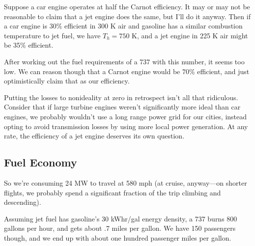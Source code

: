 \documentclass[12pt]{article}
\begin{document}
Suppose a car engine operates at half the Carnot efficiency. It may or may not be reasonable to claim that a jet engine does the same, but I'll do it anyway. Then if a car engine is 30\% efficient in 300 K air and gasoline has a similar combustion temperature to jet fuel, we have \(T_h = 750\) K, and a jet engine in 225 K air might be 35\% efficient.

After working out the fuel requirements of a 737 with this number, it seems too low. We can reason though that a Carnot engine would be 70\% efficient, and just optimistically claim that as our efficiency.

Putting the losses to nonideality at zero in retrospect isn't all that ridiculous. Consider that if large turbine engines weren't significantly more ideal than car engines, we probably wouldn't use a long range power grid for our cities, instead opting to avoid transmission losses by using more local power generation. At any rate, the efficiency of a jet engine deserves its own question.

\subsection{Fuel Economy}

So we're consuming 24 MW to travel at 580 mph (at cruise, anyway---on shorter flights, we probably spend a significant fraction of the trip climbing and descending).

Assuming jet fuel has gasoline's 30 kWhr/gal energy density, a 737 burns 800 gallons per hour, and gets about .7 miles per gallon. We have 150 passengers though, and we end up with about one hundred passenger miles per gallon.









\end{document}
